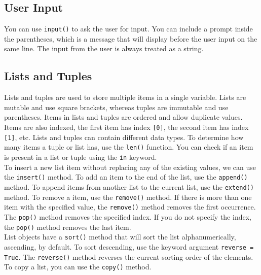 \documentclass[11pt]{scrartcl}
\theoremstyle{definition}
\begin{document}
\subsection{User Input}
You can use \texttt{input()} to ask the user for input. You can include a prompt inside the parentheses, which 
is a message that will display before the user input on the same line. The input from the user is always 
treated as a string.

\subsection{Lists and Tuples}

Lists and tuples are used to store multiple items in a single variable. Lists are mutable and use square brackets, 
whereas tuples are immutable and use parentheses. Items in lists and tuples are ordered and allow duplicate values. \\[-0.5em]

Items are also indexed, the first item has index \texttt{[0]}, the second item has index \texttt{[1]}, etc. 
Lists and tuples can contain different data types. To determine how many items a tuple or list has, use the 
\texttt{len()} function. You can check if an item is present in a list or tuple using the \texttt{in} 
keyword. \\[-0.5em]

To insert a new list item without replacing any of the existing values, we can use the \texttt{insert()} method. To 
add an item to the end of the list, use the \texttt{append()} method. To append items from another list to the current 
list, use the \texttt{extend()} method. To remove a item, use the \texttt{remove()} method. If there is more 
than one item with the specified value, the \texttt{remove()} method removes the first occurrence. The \texttt{pop()} 
method removes the specified index. If you do not specify the index, the \texttt{pop()} method removes the last item. \\[-0.5em]

List objects have a \texttt{sort()} method that will sort the list alphanumerically, ascending, by default. To sort descending, 
use the keyword argument \texttt{reverse = True}. The \texttt{reverse()} method reverses the current sorting order of the 
elements. To copy a list, you can use the \texttt{copy()} method. \\[-0.5em]
\end{document}
